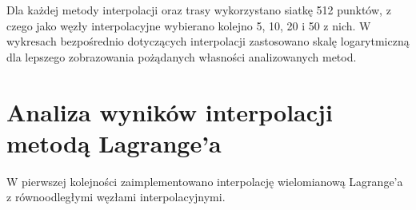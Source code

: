 \documentclass[a4paper,12pt]{article}
\begin{document}
  \begin{figure}[H]
    \centering
  \end{figure}
  \par Dla każdej metody interpolacji oraz trasy wykorzystano siatkę 512 punktów, z czego jako węzły interpolacyjne wybierano kolejno 5, 10, 20 i 50 z nich. W wykresach bezpośrednio dotyczących interpolacji zastosowano skalę logarytmiczną dla lepszego zobrazowania pożądanych własności analizowanych metod.
  
\section{Analiza wyników interpolacji metodą Lagrange'a}
	W pierwszej kolejności zaimplementowano interpolację wielomianową Lagrange'a z równoodległymi węzłami interpolacyjnymi.
	
\end{document}
